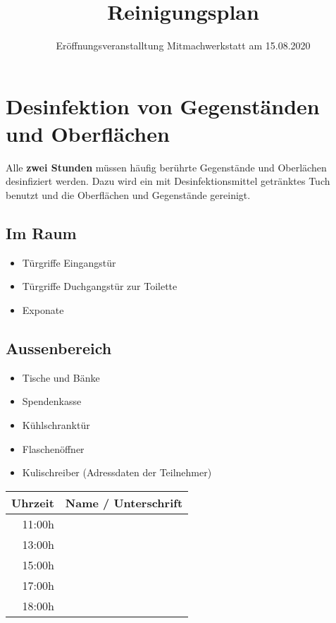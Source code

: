 \documentclass[10pt,a4paper]{scrartcl}
\title{Reinigungsplan}
\subtitle{Eröffnungsveranstalltung Mitmachwerkstatt am 15.08.2020}
\date{\vspace{-8ex}}
\begin{document}
\maketitle

\renewcommand{\arraystretch}{2.0}

\section{Desinfektion von Gegenständen und Oberflächen}
Alle \textbf{zwei Stunden} müssen häufig berührte Gegenstände und Oberlächen desinfiziert werden. Dazu wird ein mit
Desinfektionsmittel getränktes Tuch benutzt und die Oberflächen und Gegenstände gereinigt.

\subsection{Im Raum}
\begin{itemize}
\item Türgriffe Eingangstür
\item Türgriffe Duchgangstür zur Toilette
\item Exponate
\end{itemize}

\subsection{Aussenbereich}
\begin{itemize}
\item Tische und Bänke
\item Spendenkasse
\item Kühlschranktür
\item Flaschenöffner
\item Kulischreiber (Adressdaten der Teilnehmer)
\end{itemize}


\begin{tabular}{ | r | p{15cm} |}
\hline
\textbf{Uhrzeit} & \textbf{Name / Unterschrift} \\ \hline
11:00h & \\ \hline
13:00h & \\ \hline
15:00h & \\ \hline
17:00h & \\ \hline
18:00h & \\ \hline
\end{tabular}

\vspace{4ex}
\end{document}
